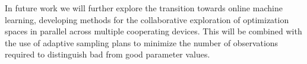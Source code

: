 In future work we will further explore the transition towards online
machine learning, developing methods for the collaborative exploration
of optimization spaces in parallel across multiple cooperating
devices. This will be combined with the use of adaptive sampling plans
to minimize the number of observations required to distinguish bad
from good parameter values.







